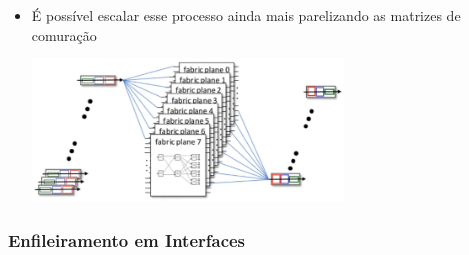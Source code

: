 \begin{itemize}[left=0.5cm, align=left, nosep]
                \item É possível escalar esse processo ainda mais parelizando as matrizes de comuração
                
                    \begin{center}
                        \includegraphics[width=0.65\textwidth]{img/cap-04/multiplos-estagios-escalavel.png}
                    \end{center}
            
            \end{itemize}

        \subsubsection*{Enfileiramento em Interfaces}    

